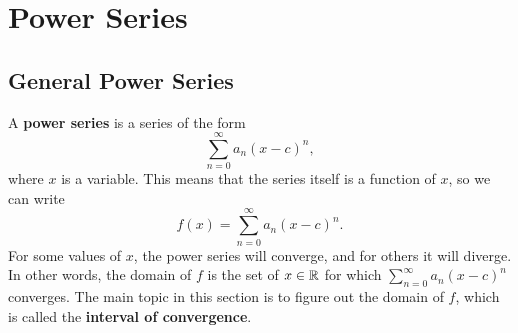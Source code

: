 \section{Power Series}


\subsection{General Power Series}

A \textbf{power series} is a series of the form
$$\sum_{n=0}^\infty a_n(x-c)^n,$$
where $x$ is a variable. This means that the series itself is a function of $x$, so we can write 
$$f(x)=\sum_{n=0}^\infty a_n(x-c)^n.$$
For some values of $x$, the power series will converge, and for others it will diverge. In other words, the domain of $f$ is the set of $x\in\mathbb{R}$ for which $\sum_{n=0}^\infty a_n(x-c)^n$ converges. The main topic in this section is to figure out the domain of $f$, which is called the \textbf{interval of convergence}.

